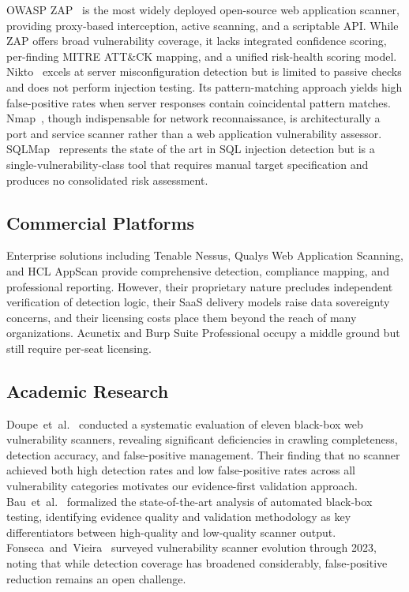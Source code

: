 \documentclass[conference]{IEEEtran}
\begin{document}
OWASP ZAP~\cite{zap2015} is the most widely deployed open-source web application scanner, providing proxy-based interception, active scanning, and a scriptable API. While ZAP offers broad vulnerability coverage, it lacks integrated confidence scoring, per-finding MITRE ATT\&CK mapping, and a unified risk-health scoring model. Nikto~\cite{nikto2001} excels at server misconfiguration detection but is limited to passive checks and does not perform injection testing. Its pattern-matching approach yields high false-positive rates when server responses contain coincidental pattern matches. Nmap~\cite{nmappaper}, though indispensable for network reconnaissance, is architecturally a port and service scanner rather than a web application vulnerability assessor. SQLMap~\cite{sqlmap2009} represents the state of the art in SQL injection detection but is a single-vulnerability-class tool that requires manual target specification and produces no consolidated risk assessment.

\subsection{Commercial Platforms}

Enterprise solutions including Tenable Nessus, Qualys Web Application Scanning, and HCL AppScan provide comprehensive detection, compliance mapping, and professional reporting. However, their proprietary nature precludes independent verification of detection logic, their SaaS delivery models raise data sovereignty concerns, and their licensing costs place them beyond the reach of many organizations. Acunetix and Burp Suite Professional occupy a middle ground but still require per-seat licensing.

\subsection{Academic Research}

Doupe~et~al.~\cite{doupe2010johnny} conducted a systematic evaluation of eleven black-box web vulnerability scanners, revealing significant deficiencies in crawling completeness, detection accuracy, and false-positive management. Their finding that no scanner achieved both high detection rates and low false-positive rates across all vulnerability categories motivates our evidence-first validation approach. Bau~et~al.~\cite{bau2010state} formalized the state-of-the-art analysis of automated black-box testing, identifying evidence quality and validation methodology as key differentiators between high-quality and low-quality scanner output. Fonseca~and~Vieira~\cite{fonseca2023survey} surveyed vulnerability scanner evolution through 2023, noting that while detection coverage has broadened considerably, false-positive reduction remains an open challenge.
\end{document}
